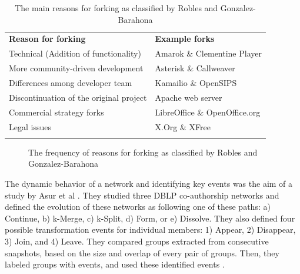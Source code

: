 \documentclass{acm_proc_article-sp}
\begin{document}
\begin{table}[!htbp]
\centering
\caption{The main reasons for forking as classified by Robles and Gonzalez-Barahona \cite{Robles}}
\label{tableReasonsForForking}
\begin{tabular}{p{} p{}}
\hline\noalign{\smallskip}
\textbf{Reason for forking} & \textbf{Example forks} \\
\noalign{\smallskip}\hline\noalign{\smallskip}
Technical (Addition of functionality) & Amarok \& Clementine Player \\ \hline
More community-driven development & Asterisk \& Callweaver \\ \hline
Differences among developer team & Kamailio \& OpenSIPS \\ \hline
Discontinuation of the original project & Apache web server \\ \hline
Commercial strategy forks & LibreOffice \& OpenOffice.org \\ \hline
Legal issues & X.Org \& XFree \\
\noalign{\smallskip}\hline
\end{tabular}
\end{table}

\begin{figure} [!htbp]
\centering
\caption{The frequency of reasons for forking as classified by Robles and Gonzalez-Barahona \cite{Robles}}
\label{figureReasonsForForkingPieChart}
\end{figure}

The dynamic behavior of a network and identifying key events was the aim of a study by Asur et al \cite{Asur}. They studied three DBLP co-authorship networks and defined the evolution of these networks as following one of these paths: a) Continue, b) k-Merge, c) k-Split, d) Form, or e) Dissolve. They also defined four possible transformation events for individual members: 1) Appear, 2) Disappear, 3) Join, and 4) Leave. They compared groups extracted from consecutive snapshots, based on the size and overlap of every pair of groups. Then, they labeled groups with events, and used these identified events \cite{Asur}.
\end{document}
